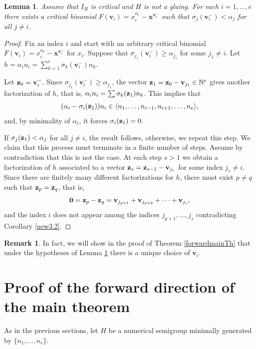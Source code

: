 \documentclass[11pt,twoside]{amsart}
\newcommand{\N}{\mathbb N}
\def\bv{{\mathbf v}}
\def\bx{{\mathbf x}}
\newtheorem{lem}[Theorem]{Lemma}
\theoremstyle{definition}
\newtheorem{rem}[Theorem]{Remark}
\numberwithin{equation}{section}
\begin{document}
\begin{lem}\label{betas}
Assume that $I_H$ is critical and  $H$ is not a gluing. 
For each $i = 1, \ldots, e$ there exists a critical binomial $ F(\bv_i) = x_i^{\alpha_i}-\bx^{\bv_i^-}$ such that $\sigma_j(\bv_i^-) < \alpha_j$ for all $j \neq i$.
\end{lem}


\begin{proof}	
Fix an index $i$ and start with an arbitrary critical binomial 
$ F(\bv_i) = x_i^{\alpha_i}-\bx^{\bv_i^-}$ for $x_i$.
Suppose that $\sigma_{j_1}(\bv_i^-)  \ge \alpha_{j_1}$ for some  $j_1 \neq i$. 
Let $h = \alpha_i n_i = \sum_{k=1}^e \sigma_k(\bv_i^-)n_k$. 

Let ${\bf z}_0 = \bv_i^-$. 
Since $\sigma_{j_1}(\bv_i^-)  \ge \alpha_{j_1}$, the vector ${\bf z}_1= {\bf z}_0-\bv_{j_1} \in \N^e$ gives  another factorization of $h$, that is,
 $\alpha_in_i = \sum \sigma_k({\bf z}_1) n_k$.
 This implies  that 
$$
(\alpha_i-\sigma_i({\bf z}_1))n_i \in \langle n_1,\ldots,n_{i-1},n_{i+1},\ldots,n_e \rangle,$$
and, by minimality of $\alpha_i$, it forces $\sigma_i({\bf z}_1)=0.
$
	
If $\sigma_j({\bf z}_1) < \alpha_j$ for all $j \neq i$, the result follows, otherwise, we repeat this step.
We claim that this process must terminate in a finite number of steps.
Assume by contradiction that this is not the case.
At  each step $s > 1$ we obtain a factorization of $h$ associated to a vector ${\bf z}_s = {\bf z}_{s-1}-{\bf v}_{j_s}$ for some index $j_s \neq i$. 
Since there are finitely many different factorizations for $h$, 
there must exist  $p\ne q$ such that ${\bf z}_p={\bf z}_q$, that is, 
$${\bf 0} = {\bf z}_p - {\bf z}_q = \bv_{j_{p+1}}+\bv_{j_{p+2}}+\cdots+\bv_{j_s},$$
	and the index $i$ does not appear among the indices $j_{p+1},\ldots,j_s$ contradicting Corollary \ref{new3.2}.
\end{proof}


\begin{rem}
In fact, we will show in the proof of Theorem \ref{forwardmainTh}
that under the hypotheses of Lemma \ref{betas} there is a unique choice of $\bv_i$.
\end{rem}

\section{Proof of the forward direction of the main theorem}



As in the previous sections, 
let $H$ 
be a numerical semigroup minimally generated by $\{n_1, \ldots, n_e\}$.
\end{document}
